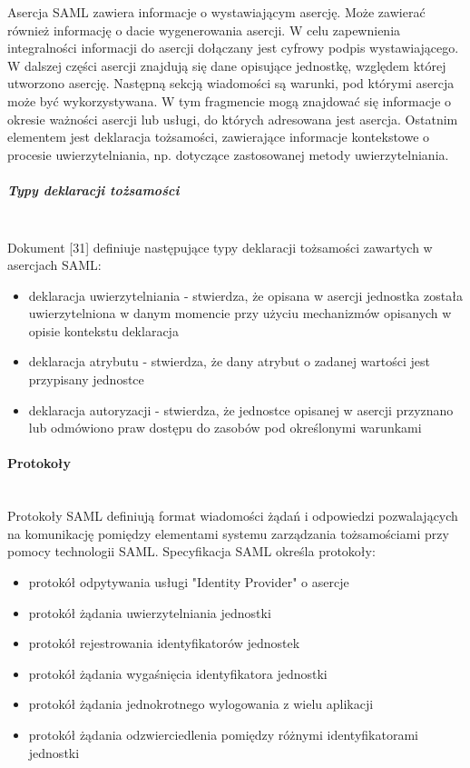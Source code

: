 				Asercja SAML zawiera informacje o wystawiającym asercję. Może zawierać również informację o dacie wygenerowania asercji. W celu zapewnienia integralności informacji do asercji dołączany jest cyfrowy podpis wystawiającego. W dalszej części asercji znajdują się dane opisujące jednostkę, względem której utworzono asercję. Następną sekcją wiadomości są warunki, pod którymi asercja może być wykorzystywana. W tym fragmencie mogą znajdować się informacje o okresie ważności asercji lub usługi, do których adresowana jest asercja. Ostatnim elementem jest deklaracja tożsamości, zawierające informacje kontekstowe o procesie uwierzytelniania, np. dotyczące zastosowanej metody uwierzytelniania.

			\subparagraph{Typy deklaracji tożsamości}\mbox{}\\

				Dokument [31] definiuje następujące typy deklaracji tożsamości zawartych w asercjach SAML:

				\begin{itemize}
				  \item deklaracja uwierzytelniania - stwierdza, że opisana w asercji jednostka została uwierzytelniona w danym momencie przy użyciu mechanizmów opisanych w opisie kontekstu deklaracja
				  \item deklaracja atrybutu - stwierdza, że dany atrybut o zadanej wartości jest przypisany jednostce
				  \item deklaracja autoryzacji - stwierdza, że jednostce opisanej w asercji przyznano lub odmówiono praw dostępu do zasobów pod określonymi warunkami
				 \end{itemize}

		\paragraph{Protokoły}\mbox{}\\ 

			Protokoły SAML definiują format wiadomości żądań i odpowiedzi pozwalających na komunikację pomiędzy elementami systemu zarządzania tożsamościami przy pomocy technologii SAML. Specyfikacja SAML określa protokoły:

			\begin{itemize}
			  \item protokół odpytywania usługi "Identity Provider" o asercje
			  \item protokół żądania uwierzytelniania jednostki
			  \item protokół rejestrowania identyfikatorów jednostek
			  \item protokół żądania wygaśnięcia identyfikatora jednostki
			  \item protokół żądania jednokrotnego wylogowania z wielu aplikacji
			  \item protokół żądania odzwierciedlenia pomiędzy różnymi identyfikatorami jednostki
			\end{itemize}


